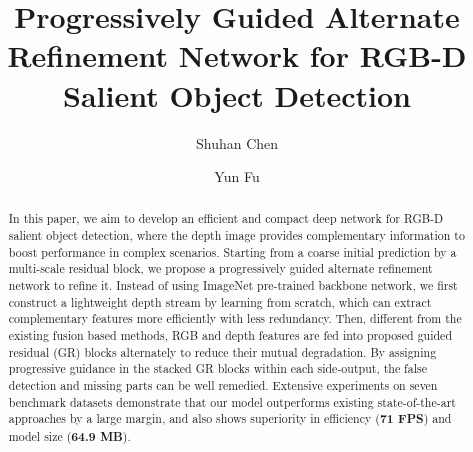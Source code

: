 \documentclass[runningheads]{llncs}
\begin{document}
\pagestyle{headings}
\mainmatter
\def\ECCVSubNumber{618}  

\title{Progressively Guided Alternate Refinement Network for RGB-D Salient Object Detection} 

\begin{comment}
\titlerunning{ECCV-20 submission ID \ECCVSubNumber} 
\authorrunning{ECCV-20 submission ID \ECCVSubNumber} 
\author{Anonymous ECCV submission}
\institute{Paper ID \ECCVSubNumber}
\end{comment}


\author{Shuhan Chen \and Yun Fu}
\maketitle

\begin{abstract}
In this paper, we aim to develop an efficient and compact deep network for RGB-D salient object detection, where the depth image provides complementary information to boost performance in complex scenarios. Starting from a coarse initial prediction by a multi-scale residual block, we propose a progressively guided alternate refinement network to refine it. Instead of using ImageNet pre-trained backbone network, we first construct a lightweight depth stream by learning from scratch, which can extract complementary features more efficiently with less redundancy. Then, different from the existing fusion based methods, RGB and depth features are fed into proposed guided residual (GR) blocks alternately to reduce their mutual degradation. By assigning progressive guidance in the stacked GR blocks within each side-output, the false detection and missing parts can be well remedied. Extensive experiments on seven benchmark datasets demonstrate that our model outperforms existing state-of-the-art approaches by a large margin, and also shows superiority in efficiency (\textbf{71 FPS}) and model size (\textbf{64.9 MB}).
\end{abstract}
\end{document}
